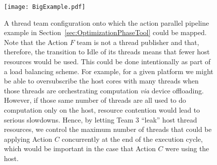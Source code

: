 \documentclass{article}
\begin{document}
\begin{figure}[!hp]
\begin{center}
\texttt{[image: BigExample.pdf]}
\caption[]{A thread team configuration onto which the action parallel pipeline
example in Section~\ref{sec:OptimizationPhaseTool} could be mapped.  Note that
the Action $F$ team is not a thread publisher and that, therefore, the
transition to Idle of its threads means that fewer host resources would be used.
This could be done intentionally as part of a load balancing scheme.  For
example, for a given platform we might be able to oversubscribe the host cores
with many threads when those threads are orchestrating computation \textit{via}
device offloading.  However, if those same number of threads are all used to do
computation only on the host, resource contention would lead to serious
slowdowns.  Hence, by letting Team 3 ``leak'' host thread resources, we control
the maximum number of threads that could be applying Action $C$ concurrently at
the end of the execution cycle, which would be important in the case that Action
$C$ were using the host.}
\label{fig:BigConfigExample}
\end{center}
\end{figure}
\end{document}
